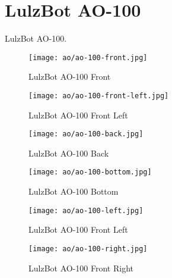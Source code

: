 %
%
%
%
%

\section{LulzBot AO-100}
LulzBot AO-100.

\begin{figure}[h!]
\texttt{[image: ao/ao-100-front.jpg]}
 \caption{LulzBot AO-100 Front}
 \label{fig:ao-100-1-front}
\end{figure}

\begin{figure}[h!]
\texttt{[image: ao/ao-100-front-left.jpg]}
 \caption{LulzBot AO-100 Front Left}
 \label{fig:ao-100-1-front-left}
\end{figure}

\begin{figure}[h!]
\texttt{[image: ao/ao-100-back.jpg]}
 \caption{LulzBot AO-100 Back}
 \label{fig:ao-100-1-back}
\end{figure}

\begin{figure}[h!]
\texttt{[image: ao/ao-100-bottom.jpg]}
 \caption{LulzBot AO-100 Bottom}
 \label{fig:ao-100-1-bottom}
\end{figure}


\begin{figure}[h!]
\texttt{[image: ao/ao-100-left.jpg]}
 \caption{LulzBot AO-100 Front Left}
 \label{fig:ao-100-1-left}
\end{figure}

\begin{figure}[h!]
\texttt{[image: ao/ao-100-right.jpg]}
 \caption{LulzBot AO-100 Front Right}
 \label{fig:ao-100-1-right}
\end{figure}

